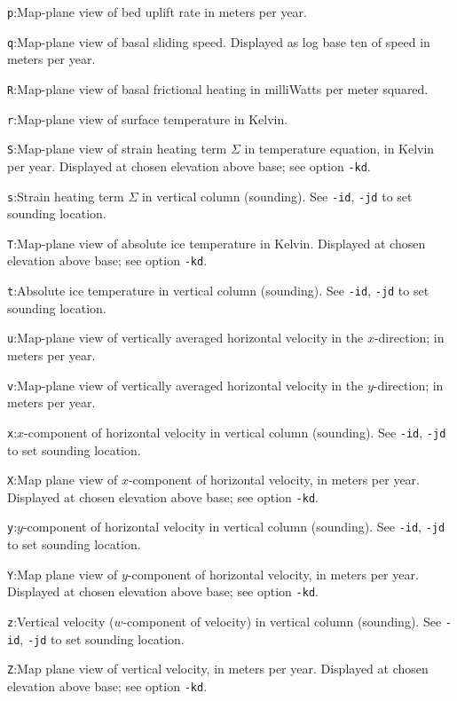 \documentclass[12pt,final]{amsart}
\begin{document}
\verb|p|:\quad Map-plane view of bed uplift rate in meters per year.

\verb|q|:\quad Map-plane view of basal sliding speed.  Displayed as log base ten of speed in meters per year.

\verb|R|:\quad Map-plane view of basal frictional heating in milliWatts per meter squared.

\verb|r|:\quad Map-plane view of surface temperature in Kelvin.

\verb|S|:\quad Map-plane view of strain heating term $\Sigma$ in temperature equation, in Kelvin per year.  Displayed at chosen elevation above base; see option \verb|-kd|.

\verb|s|:\quad Strain heating term $\Sigma$ in vertical column (sounding).  See \verb|-id|, \verb|-jd| to set sounding location.

\verb|T|:\quad Map-plane view of absolute ice temperature in Kelvin.  Displayed at chosen elevation above base; see option \verb|-kd|.

\verb|t|:\quad Absolute ice temperature in vertical column (sounding).  See \verb|-id|, \verb|-jd| to set sounding location.

\verb|u|:\quad Map-plane view of vertically averaged horizontal velocity in the $x$-direction;  in meters per year.

\verb|v|:\quad Map-plane view of vertically averaged horizontal velocity in the $y$-direction;  in meters per year.

\verb|x|:\quad $x$-component of horizontal velocity in vertical column (sounding).  See \verb|-id|, \verb|-jd| to set sounding location.

\verb|X|:\quad Map plane view of $x$-component of horizontal velocity, in meters per year.  Displayed at chosen elevation above base; see option \verb|-kd|.

\verb|y|:\quad $y$-component of horizontal velocity in vertical column (sounding).  See \verb|-id|, \verb|-jd| to set sounding location.

\verb|Y|:\quad Map plane view of $y$-component of horizontal velocity, in meters per year.  Displayed at chosen elevation above base; see option \verb|-kd|.

\verb|z|:\quad Vertical velocity ($w$-component of velocity) in vertical column (sounding).  See \verb|-id|, \verb|-jd| to set sounding location.

\verb|Z|:\quad Map plane view of vertical velocity, in meters per year.  Displayed at chosen elevation above base; see option \verb|-kd|.
\end{document}
